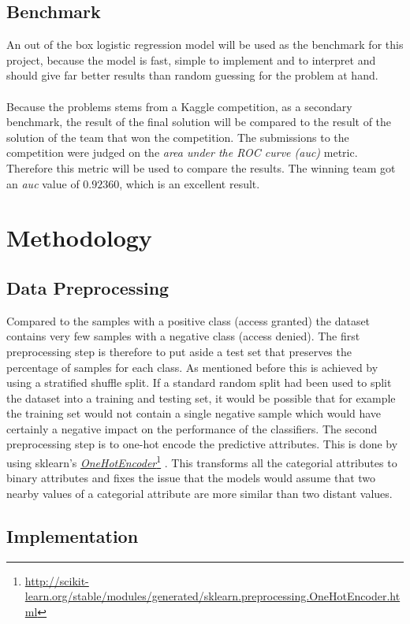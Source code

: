 \documentclass[11pt]{article}
\newcommand\fnurl[2]{%
\href{#2}{#1}\footnote{\url{#2}}%
}
\begin{document}
\subsection{Benchmark}

An out of the box logistic regression model will be used as the benchmark for 
this project, because the model is fast, simple to implement and to interpret 
and should give far better results than random guessing for the problem at hand.
\\ \\
Because the problems stems from a Kaggle competition, as a secondary benchmark, 
the result of the final solution will be compared to the result of the solution 
of the team that won the competition. 
The submissions to the competition were judged on the 
{\it area under the ROC curve (auc)} metric. 
Therefore this metric will be used to compare the results. 
The winning team got an {\it auc} value 
of $0.92360$, which is an excellent result.

\section{Methodology}

\subsection{Data Preprocessing}

Compared to the samples with a positive
class (access granted) the dataset contains very few samples with a negative class
(access denied). The first preprocessing step is therefore to put aside a test set 
that preserves the percentage of samples for each class. As mentioned before this is 
achieved by using a stratified shuffle split.
If a standard random split had been used to
split the dataset into a training and testing set, it would be possible that
for example the training set would not contain a single negative sample which
would have certainly a negative impact on the performance of the classifiers.
The second preprocessing step is to one-hot encode the predictive attributes.
This is done by using sklearn's
\fnurl{{\it OneHotEncoder}}{http://scikit-learn.org/stable/modules/generated/sklearn.preprocessing.OneHotEncoder.html}.
This transforms all the categorial attributes to binary attributes and fixes the
issue that the models would assume that two nearby values of a categorial
attribute are more similar than two distant values.

\subsection{Implementation}
\end{document}
